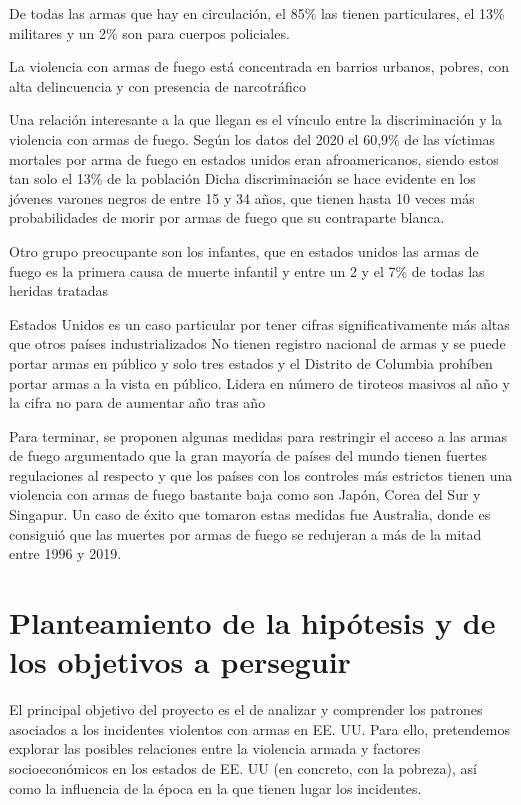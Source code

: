 \documentclass[11pt,a4paper]{article}
\begin{document}
De todas las armas que hay en circulación, el 85\% las tienen particulares, el 13\% militares y un 2\% son para cuerpos policiales. 

La violencia con armas de fuego está concentrada en barrios urbanos, pobres, con alta delincuencia y con presencia de narcotráfico 

Una relación interesante a la que llegan es el vínculo entre la discriminación y la violencia con armas de fuego. Según los datos del 2020 el 60,9\% de las víctimas mortales por arma de fuego en estados unidos eran afroamericanos, siendo estos tan solo el 13\% de la población  Dicha discriminación se hace evidente en los jóvenes varones negros de entre 15 y 34 años, que tienen hasta 10 veces más probabilidades de morir por armas de fuego que su contraparte blanca. 

Otro grupo preocupante son los infantes, que en estados unidos las armas de fuego es la primera causa de muerte infantil y entre un 2 y el 7\% de todas las heridas tratadas 

Estados Unidos es un caso particular por tener cifras significativamente más altas que otros países industrializados  No tienen registro nacional de armas y se puede portar armas en público y solo tres estados y el Distrito de Columbia prohíben portar armas a la vista en público. Lidera en número de tiroteos masivos al año y la cifra no para de aumentar año tras año 

Para terminar, se proponen algunas medidas para restringir el acceso a las armas de fuego argumentado que la gran mayoría de países del mundo tienen fuertes regulaciones al respecto y que los países con los controles más estrictos tienen una violencia con armas de fuego bastante baja como son Japón, Corea del Sur y Singapur.  Un caso de éxito que tomaron estas medidas fue Australia, donde es consiguió que las muertes por armas de fuego se redujeran a más de la mitad entre 1996 y 2019. 

\section{Planteamiento de la hipótesis y de los objetivos a perseguir}

El principal objetivo del proyecto es el de analizar y comprender los patrones asociados a los incidentes violentos con armas en EE. UU. Para ello, pretendemos explorar las posibles relaciones entre la violencia armada y factores socioeconómicos en los estados de EE. UU (en concreto, con la pobreza), así como la influencia de la época en la que tienen lugar los incidentes.
\end{document}
